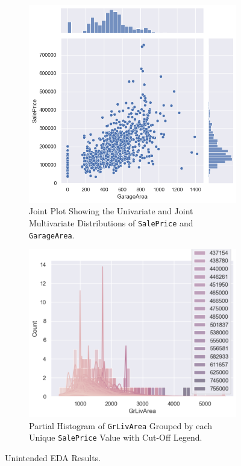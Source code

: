 \begin{figure}[h]
    \centering
    \begin{subfigure}[t]{.47\textwidth}
        \centering
        \includegraphics[width=\textwidth]{Tex//images//native_ape_eval//jointplot_garage.png}
        \caption{Joint Plot Showing the Univariate and Joint Multivariate Distributions of \texttt{SalePrice} and \texttt{GarageArea}.}
        \label{fig:native_ape_jointplot_garage}
    \end{subfigure}%
    \hfill
    \begin{subfigure}[t]{.47\textwidth}
        \centering
        \includegraphics[width=\textwidth]{Tex//images//native_ape_eval//histogram_hue.png}
        \caption{Partial Histogram of \texttt{GrLivArea} Grouped by each Unique \texttt{SalePrice} Value with Cut-Off Legend.}
        \label{fig:native_ape_histogram_hue}
    \end{subfigure}
    \caption{Unintended EDA Results.}
    \label{fig:native_ape_double_eda_plots}
\end{figure}

